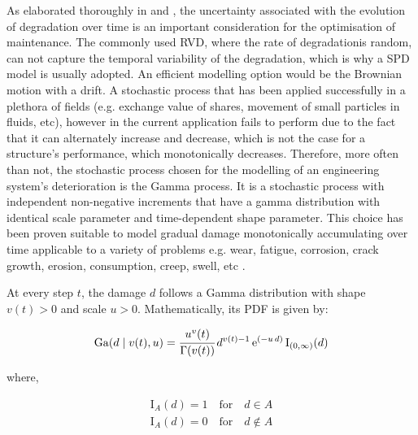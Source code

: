 As elaborated thoroughly in \cite{van2020stochastic} and \cite{van2009survey}, the uncertainty associated with the evolution of degradation over time is an important consideration for the optimisation of maintenance. The commonly used \gls{RVD}, where the rate of degradation\footnotemark is random, can not capture the temporal variability of the degradation, which is why a \gls{SPD} model is usually adopted. An efficient modelling option would be the Brownian motion with a drift. A stochastic process that has been applied successfully in a plethora of fields (e.g. exchange value of shares, movement of small particles in fluids, etc), however in the current application fails to perform due to the fact that it can alternately increase and decrease, which is not the case for a structure's performance, which monotonically decreases. Therefore, more often than not, the stochastic process chosen for the modelling of an engineering system's deterioration is the Gamma process. It is a stochastic process with independent non-negative increments that have a gamma distribution with identical scale parameter and time-dependent shape parameter. This choice has been proven suitable to model gradual damage monotonically accumulating over time applicable to a variety of problems e.g. wear, fatigue, corrosion, crack growth, erosion, consumption, creep, swell, etc \cite{van2020stochastic}.\\


\newpage

At every step $t$, the damage $d$ follows a Gamma distribution with shape $v(t) > 0$ and scale $u > 0$. Mathematically, its \gls{PDF} is given by:

\begin{equation}
    \mathrm{Ga}(d \mid v(t), u) = \cfrac{u^v(t)}{\mathrm{\Gamma}(v(t))}\,d^{v(t) - 1}\,\mathrm{e}^{(-u\, d)}\,\mathrm{I}_{(0, \infty)}(d)
\end{equation}

where,

\begin{gather*}
    \mathrm{I}_A(d) = 1 \quad \text{for} \quad d \in A \\
    \mathrm{I}_A(d) = 0 \quad \text{for} \quad d \notin A
\end{gather*}

